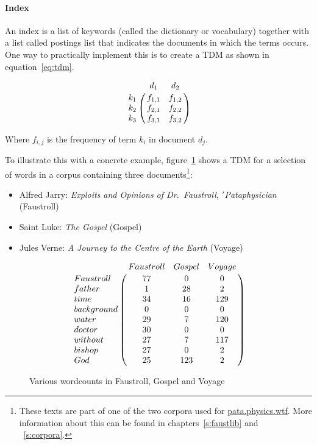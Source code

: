 \paragraph{Index}
An index is a list of keywords (called the dictionary or vocabulary) together with a list called postings list that indicates the documents in which the terms occurs. One way to practically implement this is to create a \ac{TDM} as shown in equation~\ref{eq:tdm}\marginnote{$\bm{\Sigma}$~\ref{eq:tdm}}.

\begin{equation}
  \bbordermatrix{~ & d_1 & d_2 \cr
        k_1 & f_{1,1} & f_{1,2} \cr
        k_2 & f_{2,1} & f_{2,2} \cr
        k_3 & f_{3,1} & f_{3,2}}
\label{eq:tdm}
\end{equation}

Where $f_{i,j}$ is the frequency of term $k_{i}$ in document $d_{j}$.

To illustrate this with a concrete example, figure~\ref{fig:termdocs} shows a \ac{TDM} for a selection of words in a corpus containing three documents\footnote{These texts are part of one of the two corpora used for \url{pata.physics.wtf}. More information about this can be found in chapters~\ref{s:faustlib} and ~\ref{s:corpora}.}: 

\begin{itemize}
  \item Alfred Jarry: \emph{Exploits and Opinions of Dr.\ Faustroll, $'$Pataphysician} (Faustroll) \citeyear{Jarry1996}
  \item Saint Luke: \emph{The Gospel} (Gospel)
  \item Jules Verne: \emph{A Journey to the Centre of the Earth} (Voyage)
\end{itemize}

\begin{figure}[!htbp]
\[
  \bbordermatrix{
    ~           & Faustroll & Gospel  & Voyage  \cr
    Faustroll   & 77        & 0       & 0       \cr
    father      & 1         & 28      & 2       \cr
    time        & 34        & 16      & 129     \cr
    background  & 0         & 0       & 0       \cr
    water       & 29        & 7       & 120     \cr
    doctor      & 30        & 0       & 0       \cr
    without     & 27        & 7       & 117     \cr
    bishop      & 27        & 0       & 2       \cr
    God         & 25        & 123     & 2
  }
\]
\caption[Various wordcounts]{Various wordcounts in Faustroll, Gospel and Voyage}
\label{fig:termdocs}
\end{figure}

